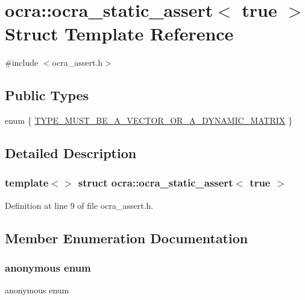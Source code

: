 \hypertarget{structocra_1_1ocra__static__assert_3_01true_01_4}{}\section{ocra\+:\+:ocra\+\_\+static\+\_\+assert$<$ true $>$ Struct Template Reference}
\label{structocra_1_1ocra__static__assert_3_01true_01_4}


{\ttfamily \#include $<$ocra\+\_\+assert.\+h$>$}

\subsection*{Public Types}
\begin{DoxyCompactItemize}
\item 
enum \{ \hyperlink{structocra_1_1ocra__static__assert_3_01true_01_4_a657a92b86d7c5d6a5b57db940b4dfb2da6c7e0005ce412fea00fe630cfeef49cc}{T\+Y\+P\+E\+\_\+\+M\+U\+S\+T\+\_\+\+B\+E\+\_\+\+A\+\_\+\+V\+E\+C\+T\+O\+R\+\_\+\+O\+R\+\_\+\+A\+\_\+\+D\+Y\+N\+A\+M\+I\+C\+\_\+\+M\+A\+T\+R\+IX}
 \}
\end{DoxyCompactItemize}


\subsection{Detailed Description}
\subsubsection*{template$<$$>$\newline
struct ocra\+::ocra\+\_\+static\+\_\+assert$<$ true $>$}



Definition at line 9 of file ocra\+\_\+assert.\+h.



\subsection{Member Enumeration Documentation}
\hypertarget{structocra_1_1ocra__static__assert_3_01true_01_4_a657a92b86d7c5d6a5b57db940b4dfb2d}{}\label{structocra_1_1ocra__static__assert_3_01true_01_4_a657a92b86d7c5d6a5b57db940b4dfb2d} 
\subsubsection{\texorpdfstring{anonymous enum}{anonymous enum}}
{\footnotesize\ttfamily anonymous enum}

